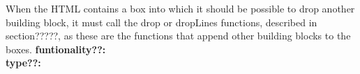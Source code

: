 \documentclass[11pt]{article}
\begin{document}
When the HTML contains a box into which it should be possible to drop another building block, it must call the drop or dropLines functions, described in section?????, as these are the functions that append other building blocks to the boxes.
\textbf{funtionality??:}\\
\textbf{type??:}\\
\end{document}
